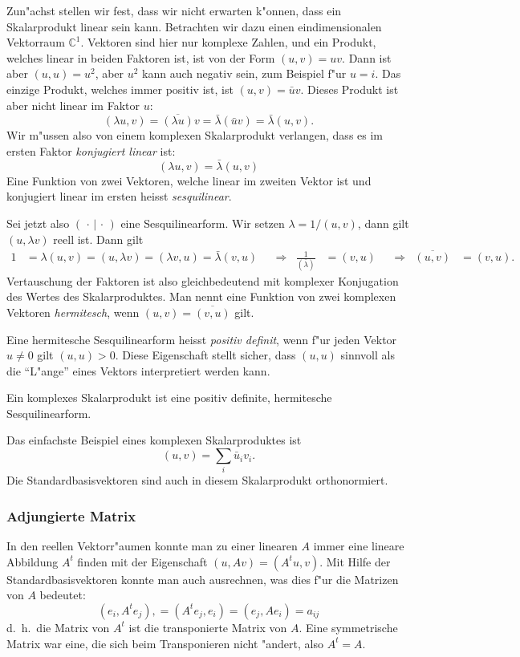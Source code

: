 Zun"achst stellen wir fest, dass wir nicht erwarten k"onnen, dass
ein Skalarprodukt linear sein kann.
Betrachten wir dazu einen eindimensionalen Vektorraum $\mathbb C^1$.
Vektoren sind hier nur komplexe Zahlen, und ein Produkt, welches
linear in beiden Faktoren ist, ist von der Form $(u,v)=uv$. Dann ist
aber $(u,u)=u^2$, aber $u^2$ kann auch negativ sein, zum Beispiel f"ur $u=i$.
Das einzige Produkt, welches immer positiv ist, ist $(u,v)=\bar uv$.
Dieses Produkt ist aber nicht linear im Faktor $u$:
\[
(\lambda u,v)=\overline{(\lambda u)}v=\bar\lambda (\bar uv)=\bar\lambda (u,v).
\]
Wir m"ussen also von einem komplexen Skalarprodukt verlangen, dass es
im ersten Faktor {\em konjugiert linear} ist:
\[
(\lambda u,v)=\bar\lambda(u,v)
\]
Eine Funktion von zwei Vektoren, welche linear im zweiten Vektor ist
und konjugiert linear im ersten heisst {\em sesquilinear}.

Sei jetzt also $(\,\cdot\,|\,\cdot\,)$ eine Sesquilinearform.
Wir setzen $\lambda = 1/(u,v)$, dann gilt
$(u,\lambda v)$ reell ist. Dann gilt
\begin{align*}
1&=\lambda (u,v)=(u,\lambda v)=(\lambda v,u)=\bar\lambda(v,u)
&
&\Rightarrow&
\frac1{(\bar\lambda)}&=(v,u)
&
&\Rightarrow&
\overline{(u,v)}&=(v,u).
\end{align*}
Vertauschung der Faktoren ist also gleichbedeutend mit komplexer Konjugation
des Wertes des Skalarproduktes. Man nennt eine Funktion von zwei komplexen
Vektoren {\em hermitesch}, wenn $(u,v)=\overline{(v,u)}$ gilt.

Eine hermitesche Sesquilinearform heisst {\em positiv definit}, wenn
f"ur jeden Vektor $u\ne 0$ gilt $(u,u)>0$. Diese Eigenschaft stellt
sicher, dass $(u,u)$ sinnvoll als die ``L"ange'' eines Vektors interpretiert
werden kann.

\begin{definition}
Ein komplexes Skalarprodukt ist eine positiv definite,
hermitesche Sesquilinearform.
\end{definition}

Das einfachste Beispiel eines komplexen Skalarproduktes ist
\[
(u,v)=\sum_i \bar u_iv_i.
\]
Die Standardbasisvektoren sind auch in diesem Skalarprodukt
orthonormiert.

\subsubsection{Adjungierte Matrix}
In den reellen Vektorr"aumen konnte man zu einer linearen $A$ immer
eine lineare Abbildung $A^t$ finden mit der Eigenschaft
$(u,Av)=(A^tu,v)$. Mit Hilfe der Standardbasisvektoren konnte
man auch ausrechnen, was dies f"ur die Matrizen von $A$ bedeutet:
\[
(e_i,A^te_j),
=
(A^te_j, e_i)
=
(e_j,Ae_i)=a_{ij}
\]
d.~h.~die Matrix von $A^t$ ist die transponierte Matrix von $A$.
Eine symmetrische Matrix war eine, die sich beim Transponieren nicht
"andert, also $A^t=A$.

